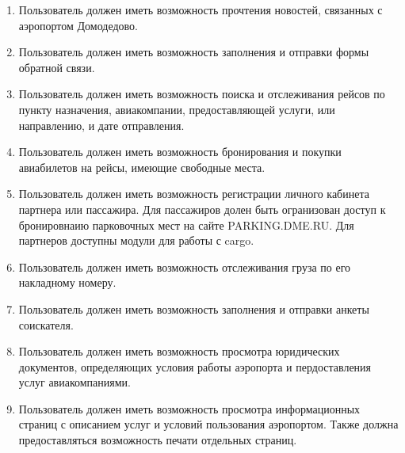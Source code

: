 \begin{enumerate}
\begin{enumerate}
            \item Пользователь должен иметь возможность прочтения
                  новостей, связанных с аэропортом Домодедово.

            \item Пользователь должен иметь возможность заполнения
                  и отправки формы обратной связи.

            \item Пользователь должен иметь возможность поиска
                  и отслеживания рейсов по пункту назначения,
                  авиакомпании, предоставляющей услуги, или
                  направлению, и дате отправления.

            \item Пользователь должен иметь возможность бронирования
                  и покупки авиабилетов на рейсы, имеющие
                  свободные места.

            \item Пользователь должен иметь возможность
                  регистрации личного кабинета партнера или
                  пассажира. Для пассажиров долен быть
                  огранизован доступ к бронировнаию парковочных
                  мест на сайте PARKING.DME.RU. Для партнеров
                  доступны модули для работы с cargo.

            \item Пользователь должен иметь возможность
                  отслеживания груза по его накладному номеру.

            \item Пользователь должен иметь возможность
                  заполнения и отправки анкеты соискателя.

            \item Пользователь должен иметь возможность
                  просмотра юридических документов, определяющих
                  условия работы аэропорта и пердоставления
                  услуг авиакомпаниями.

            \item Пользователь должен иметь возможность просмотра
                  информационных страниц с описанием услуг и
                  условий пользования аэропортом. Также должна
                  предоставляться возможность печати отдельных
                  страниц.
      \end{enumerate}
\end{enumerate}
